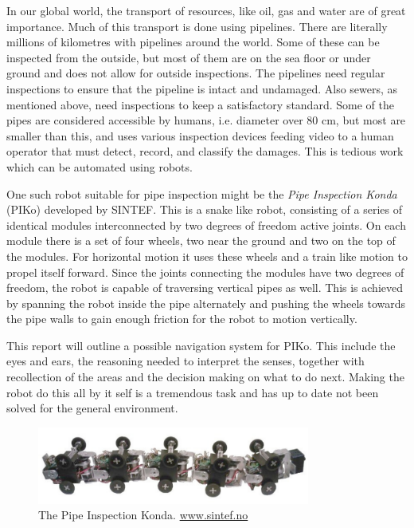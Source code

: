 In our global world, the transport of resources, like oil, gas and water are of great importance. Much of this
transport is done using pipelines. There are literally millions of kilometres with pipelines around
the world. Some of these can be inspected from the outside, but most of them are on the
sea floor or under ground and does not allow for outside inspections. 
The pipelines need regular inspections to ensure that the pipeline is intact
and undamaged. Also sewers, as mentioned above, need inspections to keep a satisfactory
standard. Some of the pipes are considered accessible by humans, i.e. diameter over 80 cm,
but most are smaller than this, and uses various inspection devices feeding video to a human
operator that must detect, record, and classify the damages. This is tedious work which
can be automated using robots. \cite{MAKRO-project}

One such robot suitable for pipe inspection might be the \emph{Pipe Inspection Konda}
(PIKo) developed by SINTEF. This is a snake like robot, consisting of a series of identical
modules interconnected by two degrees of freedom active joints. On each module there is a
set of four wheels, two near the ground and two on the top of the modules. For
horizontal motion it uses these wheels and a train like motion to propel itself forward. Since the joints 
connecting the modules have two degrees of freedom, the robot is capable of traversing vertical pipes
as well. This is achieved by spanning the robot inside the pipe alternately and pushing the wheels towards
the pipe walls to gain enough friction for the robot to motion vertically. \cite{piko}

This report will outline a possible navigation system for PIKo. This include the eyes and
ears, the reasoning needed to interpret the senses, together with recollection of the
areas and the decision making on what to do next. Making the robot do this all by it self
is a tremendous task and has up to date not been solved for the general environment.
\begin{figure}[htbp]
    \centering
    \includegraphics[width=0.8\textwidth]{pics/piko}
    \caption[The Pipe Inspection Konda]{The Pipe Inspection Konda. \url{www.sintef.no}}
    \label{chap1:fig-piko}
\end{figure}

